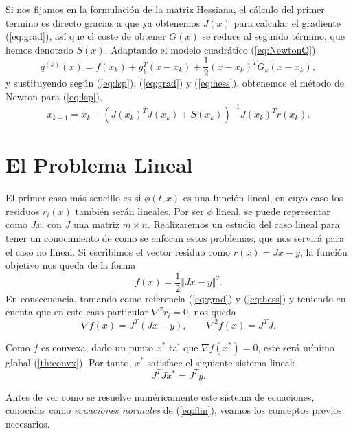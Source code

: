 \documentclass[11pt,a4paper]{book}
\theoremstyle{definition}
\theoremstyle{remark}
\begin{document}
Si nos fijamos en la formulación de la matriz Hessiana, el cálculo del primer termino es directo
gracias a que ya obtenemos $J(x)$ para calcular el gradiente (\ref{eq:grad}), así que el coste de obtener
$G(x)$ se reduce
al segundo término, que hemos denotado $S(x)$.
Adaptando el modelo cuadrático (\ref{eq:NewtonQ})
\begin{equation}
	q^{(k)}(x) = f(x_k) + g^T_k(x-x_k) + \frac{1}{2}(x-x_k)^TG_k(x-x_k),
	\label{eq:q}
\end{equation}
y sustituyendo según (\ref{eq:lsp}), (\ref{eq:grad}) y (\ref{eq:hess}), obtenemos el método de Newton para (\ref{eq:lsp}),
\begin{equation}
	x_{k+1} = x_k-(J(x_k)^TJ(x_k)+S(x_k))^{-1}J(x_k)^Tr(x_k).
	\label{eq:newtoniter}
\end{equation}

\section{El Problema Lineal}\label{sec:linealsqp}

El primer caso más sencillo es si $\phi (t, x)$ es una función lineal, en cuyo caso los residuos
$r_i(x)$ también serán lineales.
Por ser $\phi$ lineal, se puede representar como $Jx$, con $J$ una matriz
$m\times n$.
Realizaremos un estudio del caso lineal para tener un conocimiento de como se enfocan estos problemas,
que nos servirá para el caso no lineal.
Si escribimos el vector residuo como $r(x) = Jx-y$, la función objetivo nos queda de la forma
\begin{equation}
	f(x) = \frac{1}{2} \Vert Jx-y \Vert^2.
	\label{eq:flin}
\end{equation}
En consecuencia, tomando como referencia (\ref{eq:grad}) y (\ref{eq:hess}) y teniendo en cuenta que en este caso particular $\nabla^2r_i=0$, nos queda
\begin{equation}
	\nabla f(x) = J^T(Jx-y), \qquad \nabla^2 f(x) =  J^TJ.
\end{equation}

Como $f$ es convexa, dado un punto $x^*$ tal que $\nabla f(x^*) = 0$, este será mínimo global (\ref{th:convx}). Por tanto, $x^*$ satisface el siguiente sistema lineal:
\begin{equation}\label{eq:linsis}
	J^TJx^* = J^Ty.
\end{equation}

Antes de ver como se resuelve numéricamente este sistema de ecuaciones, conocidas como \textit{ecuaciones normales} de (\ref{eq:flin}), veamos los conceptos previos necesarios.
\end{document}
